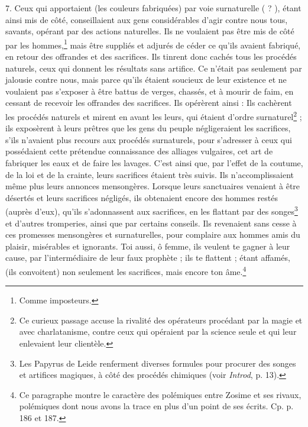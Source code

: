 \documentclass[a4paper, 11pt, oneside, polutonikogreek, french]{article}
\begin{document}
7. Ceux qui apportaient (les couleurs fabriquées) par voie surnaturelle ( ? ), étant ainsi mis de côté, conseillaient aux gens considérables d'agir contre nous tous, savants, opérant par des actions naturelles. Ils ne voulaient pas être mis de côté par les hommes,\footnote{Comme imposteurs.} mais être suppliés et adjurés de céder ce qu'ils avaient fabriqué, en retour des offrandes et des sacrifices. Ils tinrent donc cachés tous les procédés naturels, ceux qui donnent les résultats sans artifice. Ce n'était pas seulement par jalousie contre nous, mais parce qu'ils étaient soucieux de leur existence et ne voulaient pas s'exposer à être battus de verges, chassés, et à mourir de faim, en cessant de recevoir les offrandes des sacrifices. Ils opérèrent ainsi : Ils cachèrent les procédés naturels et mirent en avant les leurs, qui étaient d'ordre surnaturel\footnote{Ce curieux passage accuse la rivalité des opérateurs procédant par la magie et avec charlatanisme, contre ceux qui opéraient par la science seule et qui leur enlevaient leur clientèle.} ; ils exposèrent à leurs prêtres que les gens du peuple négligeraient les sacrifices, s'ils n'avaient plus recours aux procédés surnaturels, pour s'adresser à ceux qui possédaient cette prétendue connaissance des alliages vulgaires, cet art de fabriquer les eaux et de faire les lavages. C'est ainsi que, par l'effet de la coutume, de la loi et de la crainte, leurs sacrifices étaient très suivis. Ils n'accomplissaient même plus leurs annonces mensongères. Lorsque leurs sanctuaires venaient à être désertés et leurs sacrifices négligés, ils obtenaient encore des hommes restés (auprès d'eux), qu'ils s'adonnassent aux sacrifices, en les flattant par des songes\footnote{Les Papyrus de Leide renferment diverses formules pour procurer des songes et artifices magiques, à côté des procédés chimiques (voir \emph{Introd}, p. 13).} et d'autres tromperies, ainsi que par certains conseils. Ils revenaient sans cesse à ces promesses mensongères et surnaturelles, pour complaire aux hommes amis du plaisir, misérables et ignorants. Toi aussi, ô femme, ils veulent te gagner à leur cause, par l'intermédiaire de leur faux prophète ; ils te flattent ; étant affamés, (ils convoitent) non seulement les sacrifices, mais encore ton âme.\footnote{Ce paragraphe montre le caractère des polémiques entre Zosime et ses rivaux, polémiques dont nous avons la trace en plus d'un point de ses écrits. Cp. p. 186 et 187.}
\end{document}
